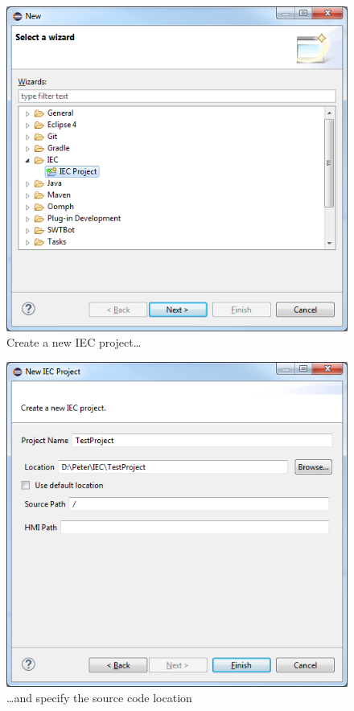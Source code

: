 \begin{figure}[hp]
  \centering
    \includegraphics[scale=0.55]{bilder/manual-new_project1}
  \caption{Create a new IEC project\ldots}
  \label{fig:manual-new_project1}
\end{figure}

\begin{figure}[hp]
  \centering
    \includegraphics[scale=0.55]{bilder/manual-new_project2}
  \caption{\ldots{}and specify the source code location}
  \label{fig:manual-new_project2}
\end{figure}

